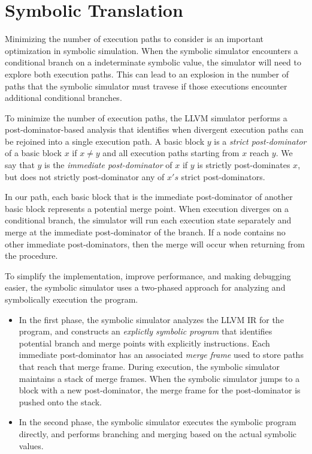 \documentclass{article}
\begin{document}
\section{Symbolic Translation}

Minimizing the number of execution paths to consider is an important
optimization in symbolic simulation.
%
When the symbolic simulator encounters a conditional branch on a indeterminate
symbolic value, the simulator will need to explore both execution paths.
%
This can lead to an explosion in the number of paths that the symbolic
simulator must travese if those executions encounter additional conditional
branches.

To minimize the number of execution paths, the LLVM simulator performs a
post-dominator-based analysis that identifies when divergent execution paths
can be rejoined into a single execution path.
%
A basic block $y$ is a \emph{strict post-dominator} of a basic block $x$ if $x
\neq y$ and all execution paths starting from $x$ reach $y$.
%
We say that $y$ is the \emph{immediate post-dominator} of $x$ if $y$ is
strictly post-dominates $x$, but does not strictly post-dominator any of $x's$
strict post-dominators.

In our path, each basic block that is the immediate post-dominator of another
basic block represents a potential merge point.
%
When execution diverges on a conditional branch, the simulator will run each
execution state separately and merge at the immediate post-dominator of the
branch.
%
If a node contains no other immediate post-dominators, then the merge will
occur when returning from the procedure.

To simplify the implementation, improve performance, and making debugging easier,
the symbolic simulator uses a two-phased approach for analyzing and symbolically
execution the program.

\begin{itemize}

 \item In the first phase, the symbolic simulator analyzes the LLVM IR for the
         program, and constructs an \emph{explictly symbolic program} that
         identifies potential branch and merge points with explicitly
         instructions.  Each immediate post-dominator has an associated
         \emph{merge frame} used to store paths that reach that merge frame.
         During execution, the symbolic simulator maintains a stack of merge
         frames.  When the symbolic simulator jumps to a block with a new
         post-dominator, the merge frame for the post-dominator is pushed 
         onto the stack.

 \item In the second phase, the symbolic simulator executes the symbolic
         program directly, and performs branching and merging based on
         the actual symbolic values.

\end{itemize}
\end{document}
